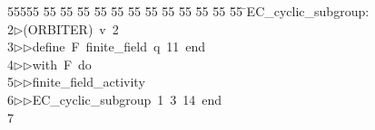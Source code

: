 %
%
\begin{tabbing}
55555 \= 55 \= 55 \= 55 \= 55 \= 55 \= 55 \= 55 \= 55 \= 55 \= 55 \= 55 \= 55 \= \>EC\_cyclic\_subgroup:\\[0pt]
2\>$\triangleright$\>(ORBITER)\ v\ 2\ \\[0pt]
3\>$\triangleright$\>$\triangleright$\>define\ F\ finite\_field\ q\ 11\ end\ \\[0pt]
4\>$\triangleright$\>$\triangleright$\>with\ F\ do\ \\[0pt]
5\>$\triangleright$\>$\triangleright$\>finite\_field\_activity\ \\[0pt]
6\>$\triangleright$\>$\triangleright$\>EC\_cyclic\_subgroup\ 1\ 3\ 14\ end\\[0pt]
7\>\end{tabbing}
